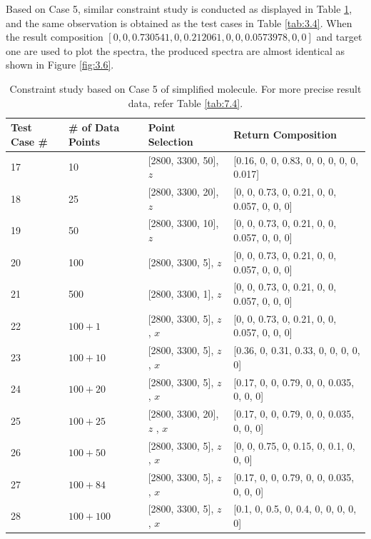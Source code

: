 Based on Case 5, similar constraint study is conducted as displayed in Table \ref{tab:3.5}, and the same observation is obtained as the test cases in Table \ref{tab:3.4}. When the result composition $[0, 0, 0.730541, 0, 0.212061,0, 0, 0.0573978, 0, 0]$ and target one are used to plot the spectra, the produced spectra are almost identical as shown in Figure \ref{fig:3.6}.
\begin{table} \small
\begin{center} 
{\def\arraystretch{1.5}
\begin{tabular}{| p{1cm} | p{2cm} | p{4cm}  | l |}
\hline
Test Case \# & \# of Data Points & Point Selection & Return Composition \\ \hline
17 & 10 & [2800, 3300, 50], $z$ & [0.16, 0, 0, 0.83, 0, 0, 0, 0, 0, 0.017] \\ \hline
18 & 25 & [2800, 3300, 20], $z$ & [0, 0, 0.73, 0, 0.21, 0, 0, 0.057, 0, 0, 0] \\ \hline
19 & 50 & [2800, 3300, 10], $z$ & [0, 0, 0.73, 0, 0.21, 0, 0, 0.057, 0, 0, 0] \\ \hline
20 & 100 & [2800, 3300, 5], $z$ & [0, 0, 0.73, 0, 0.21, 0, 0, 0.057, 0, 0, 0] \\ \hline
21 & 500 & [2800, 3300, 1], $z$ & [0, 0, 0.73, 0, 0.21, 0, 0, 0.057, 0, 0, 0] \\ \hline	
22 & $100 + 1$ & [2800, 3300, 5], $z$ \newline [2800, 3300, 500], $x$  & [0, 0, 0.73, 0, 0.21, 0, 0, 0.057, 0, 0, 0] \\ \hline
23 & $100 + 10$ & [2800, 3300, 5], $z$ \newline [2800, 3300, 50], $x$  & [0.36, 0, 0.31, 0.33, 0, 0, 0, 0, 0] \\ \hline
24 & $100 + 20$ & [2800, 3300, 5], $z$ \newline [2800, 3300, 25], $x$  & [0.17, 0, 0, 0.79, 0, 0, 0.035, 0, 0, 0] \\ \hline
25 & $100 + 25$ & [2800, 3300, 20], $z$ \newline [2800, 3300, 20], $x$  & [0.17, 0, 0, 0.79, 0, 0, 0.035, 0, 0, 0] \\ \hline
26 & $100 + 50$ & [2800, 3300, 5], $z$ \newline [2800, 3300, 10], $x$  & [0, 0, 0.75, 0, 0.15, 0, 0.1, 0, 0, 0] \\ \hline
27 & $100 + 84$ & [2800, 3300, 5], $z$ \newline [2800, 3300, 6], $x$  & [0.17, 0, 0, 0.79, 0, 0, 0.035, 0, 0, 0] \\ \hline
28 & $100 + 100$ & [2800, 3300, 5], $z$ \newline [2800, 3300, 5], $x$  & [0.1, 0, 0.5, 0, 0.4, 0, 0, 0, 0, 0] \\ 
\hline
\end{tabular} \\
}
\caption{Constraint study based on Case 5 of simplified molecule. For more precise result data, refer Table \ref{tab:7.4}.}\label{tab:3.5}
\end{center}
\end{table}

